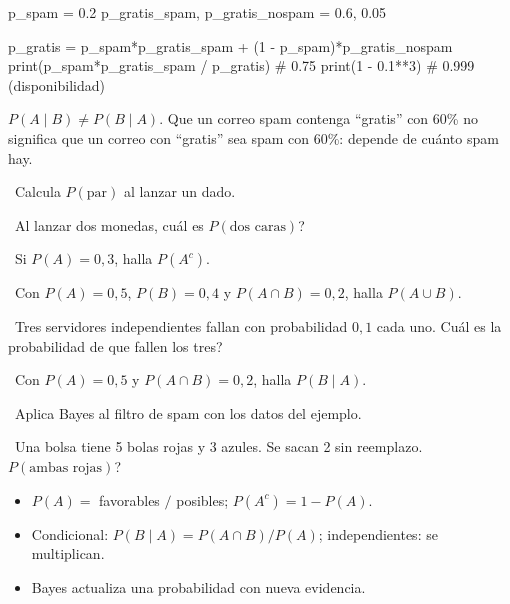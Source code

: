 \begin{tmcodigo}
p_spam = 0.2
p_gratis_spam, p_gratis_nospam = 0.6, 0.05

p_gratis = p_spam*p_gratis_spam + (1 - p_spam)*p_gratis_nospam
print(p_spam*p_gratis_spam / p_gratis)      # 0.75
print(1 - 0.1**3)                           # 0.999 (disponibilidad)
\end{tmcodigo}

\begin{tmcuidado}$P(A\mid B)\neq P(B\mid A)$. Que un correo spam contenga ``gratis'' con 60\% no significa que un correo con ``gratis'' sea spam con 60\%: depende de cu\'anto spam hay.\end{tmcuidado}

\begin{tmejercicios}
\label{ej:5-1}
\begin{tmlista}
\item \tmbasico\ Calcula $P(\text{par})$ al lanzar un dado.
\item \tmbasico\ Al lanzar dos monedas, \textquestiondown cu\'al es $P(\text{dos caras})$?
\item \tmbasico\ Si $P(A)=0{,}3$, halla $P(A^c)$.
\item \tmmedio\ Con $P(A)=0{,}5$, $P(B)=0{,}4$ y $P(A\cap B)=0{,}2$, halla $P(A\cup B)$.
\item \tmmedio\ Tres servidores independientes fallan con probabilidad $0{,}1$ cada uno. \textquestiondown Cu\'al es la probabilidad de que fallen los tres?
\item \tmmedio\ Con $P(A)=0{,}5$ y $P(A\cap B)=0{,}2$, halla $P(B\mid A)$.
\item \tmdificil\ Aplica Bayes al filtro de spam con los datos del ejemplo.
\item \tmdificil\ Una bolsa tiene 5 bolas rojas y 3 azules. Se sacan 2 sin reemplazo. \textquestiondown $P(\text{ambas rojas})$?
\end{tmlista}
\end{tmejercicios}


\begin{tmresumen}
\begin{itemize}
\item $P(A)=$ favorables $/$ posibles; $P(A^c)=1-P(A)$.
\item Condicional: $P(B\mid A)=P(A\cap B)/P(A)$; independientes: se multiplican.
\item Bayes actualiza una probabilidad con nueva evidencia.
\end{itemize}
\end{tmresumen}

